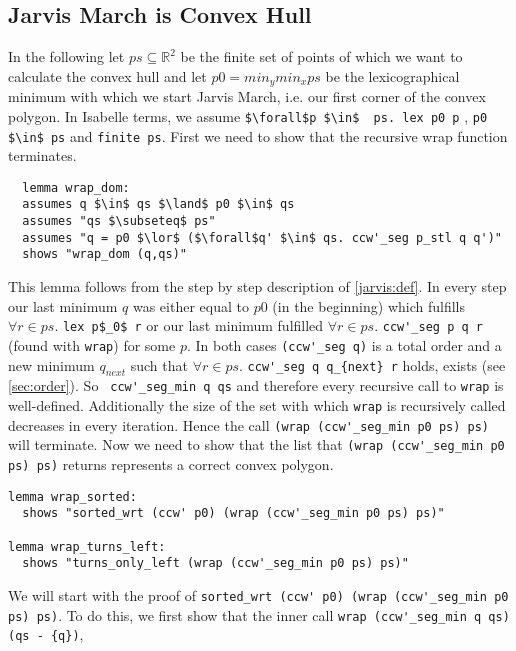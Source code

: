 \subsection{Jarvis March is Convex Hull}
\label{jarvis:proofs}
In the following let $ps \subseteq \mathbb{R}^2$ be the finite set of points of which we want to calculate
the convex hull and let $p0 = min_y min_x ps$ be the lexicographical minimum with which we start 
Jarvis March, i.e. our first corner of the convex polygon. In Isabelle terms, we assume 
\lstinline|$\forall$p $\in$  ps. lex p0 p| \space , \space  \lstinline|p0 $\in$ ps| \space  and \space  \lstinline|finite ps|.
First we need to show that the recursive wrap function terminates. 
\begin{lstlisting}
  lemma wrap_dom:
  assumes q $\in$ qs $\land$ p0 $\in$ qs
  assumes "qs $\subseteq$ ps"
  assumes "q = p0 $\lor$ ($\forall$q' $\in$ qs. ccw'_seg p_stl q q')"
  shows "wrap_dom (q,qs)"
\end{lstlisting}
This lemma follows from the step by step 
description of \ref*{jarvis:def}. In every step our last minimum $q$ was either equal to $p0$ (in the beginning) 
which fulfills $\forall r \in ps.$ \lstinline|lex p$_0$ r| or our last minimum fulfilled 
$\forall r \in ps.$ \lstinline|ccw'_seg p q r| (found with \lstinline|wrap|) for some $p$.
In both cases \lstinline|(ccw'_seg q)| is a total order and a new minimum $q_{next}$ such that 
$\forall r \in ps.$ \lstinline|ccw'_seg q q_{next} r| holds, exists (see \ref*{sec:order}). So 
\lstinline| ccw'_seg_min q qs| and therefore every recursive call to \lstinline|wrap| is well-defined. 
Additionally the size of the set with which \lstinline|wrap| is recursively called 
decreases in every iteration. Hence the call  \lstinline|(wrap (ccw'_seg_min p0 ps) ps)|
will terminate.
Now we need to show that the list that \lstinline|(wrap (ccw'_seg_min p0 ps) ps)| 
returns represents a correct convex polygon.
\begin{lstlisting}
lemma wrap_sorted:
  shows "sorted_wrt (ccw' p0) (wrap (ccw'_seg_min p0 ps) ps)"

lemma wrap_turns_left:
  shows "turns_only_left (wrap (ccw'_seg_min p0 ps) ps)"
\end{lstlisting}
We will start with the proof of \lstinline|sorted_wrt (ccw' p0) (wrap (ccw'_seg_min p0 ps) ps)|.
To do this, we first show that the inner call \lstinline|wrap (ccw'_seg_min q qs) (qs - {q})|,
